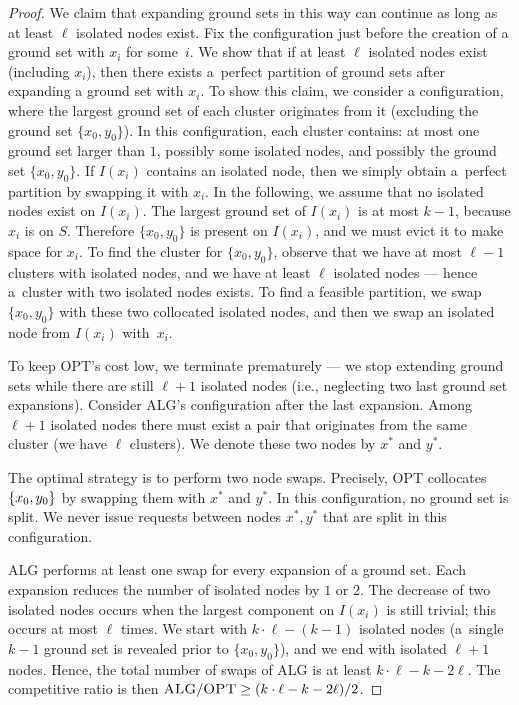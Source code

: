 \documentclass[a4paper,anonymous,USenglish]{lipics-v2019}
\newcommand{\OPT}{\textsc{OPT}\xspace}
\newcommand{\ALG}{\textsc{ALG}\xspace}
\DeclarePairedDelimiter\set{\{}{\}}
\begin{document}
\begin{proof}
	We claim that expanding ground sets in this way can continue as long as at least $\ell$ isolated nodes exist.
	Fix the configuration just before the creation of a ground set with $x_i$ for some~$i$.
	We show that if at least $\ell$ isolated nodes exist (including $x_i$), then there exists a~perfect partition of ground sets after expanding a ground set with $x_i$.
	To show this claim, we consider a configuration, where the largest ground set of each cluster originates from it (excluding the ground set $\{x_0, y_0\}$).
	In this configuration, each cluster contains:  at most one ground set larger than $1$, possibly some isolated nodes, and possibly the ground set $\{x_0, y_0\}$.
	If $I(x_i)$ contains an isolated node, then we simply obtain a~perfect partition by swapping it with $x_i$.
	In the following, we assume that no isolated nodes exist on $I(x_i)$.
	The largest ground set of $I(x_i)$ is at most $k-1$, because $x_i$ is on $S$.
	Therefore $\{x_0, y_0\}$ is present on $I(x_i)$, and we must evict it to make space for $x_i$.
	To find the cluster for $\{x_0, y_0\}$, observe that we have at most $\ell-1$ clusters with isolated nodes, and we have at least $\ell$ isolated nodes --- hence a~cluster with two isolated nodes exists.
	To find a feasible partition, we swap $\{x_0, y_0\}$ with these two collocated isolated nodes, and then we swap an isolated node from $I(x_i)$ with~$x_i$.
	

	To keep \OPT's cost low, we terminate prematurely --- we stop extending ground sets while there are still $\ell+1$ isolated nodes (i.e., neglecting two last ground set expansions).
	Consider \ALG's configuration after the last expansion.
	Among $\ell+1$ isolated nodes there must exist a pair that originates from the same cluster (we have $\ell$ clusters). 
	We denote these two nodes by $x^*$ and $y^*$.

	The optimal strategy is to perform two node swaps.
	Precisely, \OPT collocates $\set{x_0,y_0}$ by swapping them with $x^*$ and $y^*$.
	In this configuration, no ground set is split.
	We never issue requests between nodes $x^*, y^*$ that are split in this configuration.


	\ALG performs at least one swap for every expansion of a ground set.
	Each expansion reduces the number of isolated nodes by $1$ or $2$.
	The decrease of two isolated nodes occurs when the largest component on  $I(x_i)$ is still trivial; this occurs at most $\ell$ times.
	We start with $k \cdot \ell - (k-1)$ isolated nodes (a~single $k-1$ ground set is revealed prior to $\{x_0, y_0\}$), and we end with isolated $\ell+1$ nodes.
	Hence, the total number of swaps of \ALG is at least $k\cdot \ell - k - 2 \ell$.
	The competitive ratio is then $\ALG / \OPT \geq (k\cdot \ell - k - 2\ell) / 2$.
\end{proof}
\end{document}

